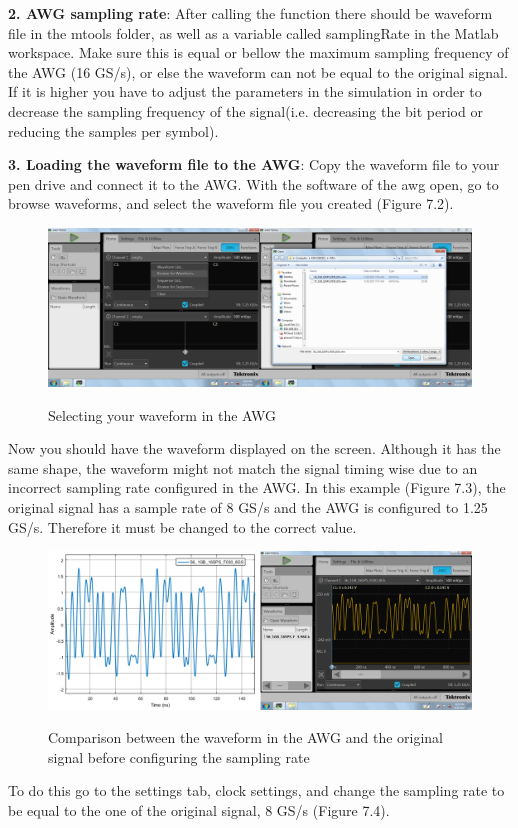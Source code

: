 \noindent
\bigskip
\textbf{2. AWG sampling rate}: 
After calling the function there should be waveform file in the mtools folder, as well as a variable called samplingRate in the Matlab workspace. Make sure this is equal or bellow the maximum sampling frequency of the AWG (16 GS/s), or else the waveform can not be equal to the original signal. If it is higher you  have to adjust the parameters in the simulation in order to decrease the sampling frequency of the signal(i.e. decreasing the bit period or reducing the samples per symbol).
\bigskip

\noindent
\textbf{3. Loading the waveform file to the AWG}:
Copy the waveform file to your pen drive and connect it to the AWG. With the software of the awg open, go to browse waveforms, and select the waveform file you created (Figure 7.2).

\begin{figure}[h]
	\centering
	\includegraphics[width=\textwidth]{../mtools/sgnToWfm/figures/tutorial1}
	\label{TUT_SelectingWFM}\caption{Selecting your waveform in the AWG}
\end{figure}

Now you should have the waveform displayed on the screen. Although it has the same shape,  the waveform might not match the signal timing wise due to an incorrect sampling rate  configured in the AWG. 
In this example (Figure 7.3), the original signal has a sample rate of 8 GS/s and the AWG is configured to 1.25 GS/s. Therefore it must be changed to the correct value.

\begin{figure}[h]
	\centering
	\includegraphics[width=\textwidth]{../mtools/sgnToWfm/figures/tutorial2}
	\label{TUT_CompBad}\caption{Comparison between the waveform in the AWG and the original signal before configuring the sampling rate}
\end{figure}
\bigskip
To do this go to the settings tab, clock settings, and change the sampling rate to be equal to the one of the original signal, 8 GS/s (Figure 7.4).

